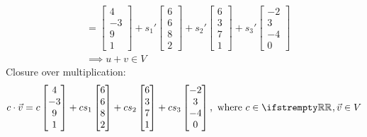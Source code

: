 \documentclass[12pt, a4paper]{article}
\begin{document}
\begin{enumerate}[Q\arabic*.]
\begin{align*}
      &= \begin{bmatrix}4\\-3\\9\\1\end{bmatrix} + s_1'\begin{bmatrix}6\\6\\8\\2\end{bmatrix} + s_2'\begin{bmatrix}6\\3\\7\\1\end{bmatrix} + s_3'\begin{bmatrix}-2\\3\\-4\\0\end{bmatrix}\tag*{($\RR$ closed over addition)}\\
      &\implies u+v \in V
    \end{align*}
    Closure over multiplication:
    \begin{align*}
      c \cdot \vec{v} &= c\begin{bmatrix}4\\-3\\9\\1\end{bmatrix} + cs_1\begin{bmatrix}6\\6\\8\\2\end{bmatrix} + cs_2\begin{bmatrix}6\\3\\7\\1\end{bmatrix} + cs_3\begin{bmatrix}-2\\3\\-4\\0\end{bmatrix}, \text{ where }c \in \RR, \vec{v} \in V\\

\end{align*}
\end{enumerate}
\end{document}
